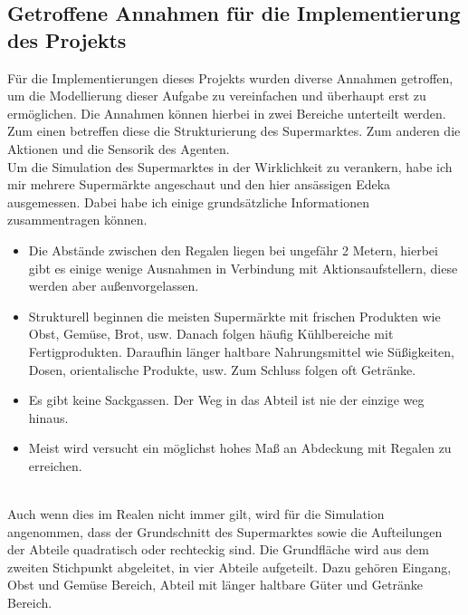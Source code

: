 \subsection{Getroffene Annahmen für die Implementierung des Projekts}
\label{annahmen}
Für die Implementierungen dieses Projekts wurden diverse Annahmen getroffen, um die Modellierung dieser Aufgabe zu vereinfachen und überhaupt erst zu ermöglichen. Die Annahmen können hierbei in zwei Bereiche unterteilt werden. Zum einen betreffen diese die Strukturierung des Supermarktes. Zum anderen die Aktionen und die Sensorik des Agenten.
\\
Um die Simulation des Supermarktes in der Wirklichkeit zu verankern, habe ich mir mehrere Supermärkte angeschaut und den hier ansässigen Edeka ausgemessen. Dabei habe ich einige grundsätzliche Informationen zusammentragen können. 
\\
\begin{itemize}
	\item Die Abstände zwischen den Regalen liegen bei ungefähr 2 Metern, hierbei gibt es einige wenige Ausnahmen in Verbindung mit Aktionsaufstellern, diese werden aber außenvorgelassen.
	\item Strukturell beginnen die meisten Supermärkte mit frischen Produkten wie Obst, Gemüse, Brot, usw. Danach folgen häufig Kühlbereiche mit Fertigprodukten. Daraufhin länger haltbare Nahrungsmittel wie Süßigkeiten, Dosen, orientalische Produkte, usw. Zum Schluss folgen oft Getränke.
	\item Es gibt keine Sackgassen. Der Weg in das Abteil ist nie der einzige weg hinaus.
	\item Meist wird versucht ein möglichst hohes Maß an Abdeckung mit Regalen zu erreichen.
\end{itemize}
\noindent
\\
Auch wenn dies im Realen nicht immer gilt, wird für die Simulation angenommen, dass der Grundschnitt des Supermarktes sowie die Aufteilungen der Abteile quadratisch oder rechteckig sind. Die Grundfläche wird aus dem zweiten Stichpunkt abgeleitet, in vier Abteile aufgeteilt. Dazu gehören Eingang, Obst und Gemüse Bereich, Abteil mit länger haltbare Güter und Getränke Bereich. 
\\
